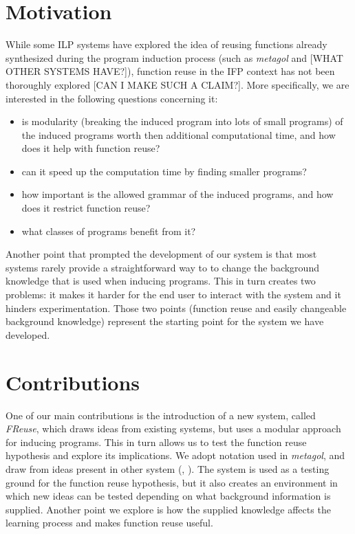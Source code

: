 \section{Motivation}
\indent \indent While some ILP systems have explored the idea of reusing functions already synthesized during the program induction process (such as \textit{metagol} and [WHAT OTHER SYSTEMS HAVE?]), function reuse in the IFP context has not been thoroughly explored [CAN I MAKE SUCH A CLAIM?]. More specifically, we are interested in the following questions concerning it:
\begin{itemize}
\item is modularity (breaking the induced program into lots of small programs) of the induced programs worth then additional computational time, and how does it help with function reuse?
\item can it speed up the computation time by finding smaller programs?
\item how important is the allowed grammar of the induced programs, and how does it restrict function reuse?
\item what classes of programs benefit from it?
\end{itemize}
\indent \indent Another point that prompted the development of our system is that most systems rarely provide a straightforward way to to change the background knowledge that is used when inducing programs.  This in turn creates two problems: it makes it harder for the end user to interact with the system and it hinders experimentation. Those two points (function reuse and easily changeable background knowledge) represent the starting point for the system we have developed.

\section{Contributions}
\indent \indent One of our main contributions is the introduction of a new system, called \textit{FReuse}, which draws ideas from existing systems, but uses a modular approach for inducing programs. This in turn allows us to test the function reuse hypothesis and explore its implications. We adopt notation used in \textit{metagol}, and draw from ideas present in other system (\cite{lambdasq}, \cite{mhask}). The system is used as a testing ground for the function reuse hypothesis, but it also creates an environment in which new ideas can be tested depending on what background information is supplied. Another point we explore is how the supplied knowledge affects the learning process and makes function reuse useful.

